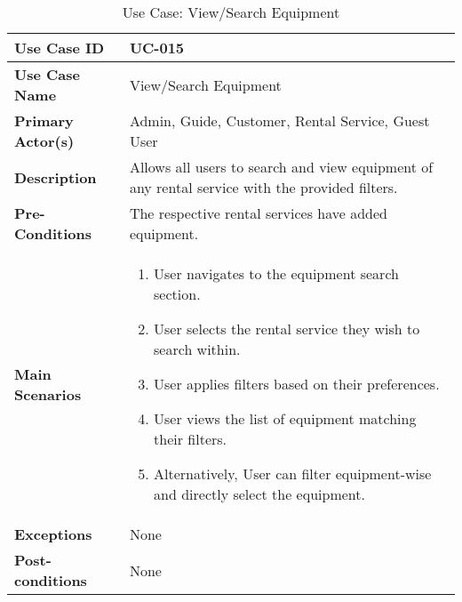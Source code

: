 \begin{table}[ht]
    \centering
    \begin{tabular}{|l|p{}|}
        \hline
        \textbf{Use Case ID} & UC-015 \\
        \hline
        \textbf{Use Case Name} & View/Search Equipment \\
        \hline
        \textbf{Primary Actor(s)} & Admin, Guide, Customer, Rental Service, Guest User \\
        \hline
        \textbf{Description} & Allows all users to search and view equipment of any rental service with the provided filters. \\
        \hline
        \textbf{Pre-Conditions} & The respective rental services have added equipment. \\
        \hline
        \textbf{Main Scenarios} & 
        \begin{enumerate}[label=\arabic*.,itemsep=0pt]
            \item User navigates to the equipment search section.
            \item User selects the rental service they wish to search within.
            \item User applies filters based on their preferences.
            \item User views the list of equipment matching their filters.
            \item Alternatively, User can filter equipment-wise and directly select the equipment.
        \end{enumerate} \\
        \hline
        \textbf{Exceptions} & None \\
        \hline
        \textbf{Post-conditions} & None \\
        \hline
    \end{tabular}
    \label{tab:use-case-view-search-equipment}
    \caption{Use Case: View/Search Equipment}
\end{table}


